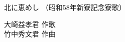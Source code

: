 \documentclass[10pt,b5j]{tarticle} %
\begin{document}
\begin{minipage}[c]{0.7\hsize} %
    \begin{center}
        {\LARGE
            北に恵めし %
        }
        {\small 
            （昭和58年新寮記念寮歌） %
        }
    \end{center}
\end{minipage}
\begin{minipage}[c]{0.3\hsize} %
    \begin{flushright} %
        大崎益孝君 作歌\\竹中秀文君 作曲 %
    \end{flushright}
\end{minipage}
\end{document}
